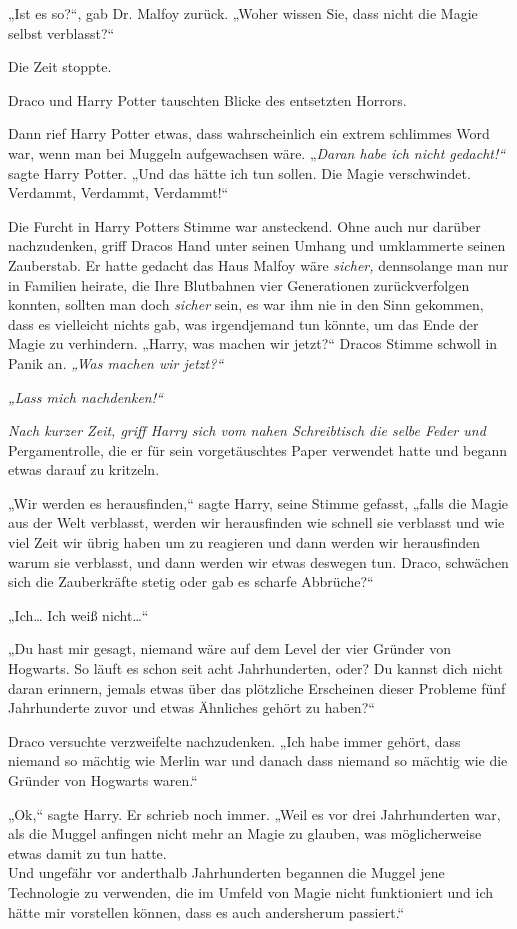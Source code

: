 {„Ist es so?“, gab Dr. Malfoy zurück. „Woher wissen Sie, dass nicht die Magie selbst verblasst?“

Die Zeit stoppte.

Draco und Harry Potter tauschten Blicke des entsetzten Horrors.

Dann rief Harry Potter etwas, dass wahrscheinlich ein extrem schlimmes Word war, wenn man bei Muggeln aufgewachsen wäre. „\emph{Daran habe ich nicht gedacht!“} sagte Harry Potter. „Und das hätte ich tun sollen. Die Magie verschwindet. Verdammt, Verdammt, Verdammt!“

Die Furcht in Harry Potters Stimme war ansteckend. Ohne auch nur darüber nachzudenken, griff Dracos Hand unter seinen Umhang und umklammerte seinen Zauberstab. Er hatte gedacht das Haus Malfoy wäre \emph{sicher,} dennsolange man nur in Familien heirate, die Ihre Blutbahnen vier Generationen zurückverfolgen konnten, sollten man doch \emph{sicher} sein, es war ihm nie in den Sinn gekommen, dass es vielleicht nichts gab, was irgendjemand tun könnte, um das Ende der Magie zu verhindern. „Harry, was machen wir jetzt?“ Dracos Stimme schwoll in Panik an. \emph{„Was machen wir jetzt?“}

\emph{„Lass mich nachdenken!“}

\emph{Nach kurzer Zeit, griff Harry sich vom nahen Schreibtisch die selbe Feder und} Pergamentrolle, die er für sein vorgetäuschtes Paper verwendet hatte und begann etwas darauf zu kritzeln.

„Wir werden es herausfinden,“ sagte Harry, seine Stimme gefasst, „falls die Magie aus der Welt verblasst, werden wir herausfinden wie schnell sie verblasst und wie viel Zeit wir übrig haben um zu reagieren und dann werden wir herausfinden warum sie verblasst, und dann werden wir etwas deswegen tun. Draco, schwächen sich die Zauberkräfte stetig oder gab es scharfe Abbrüche?“

„Ich… Ich weiß nicht…“

„Du hast mir gesagt, niemand wäre auf dem Level der vier Gründer von Hogwarts. So läuft es schon seit acht Jahrhunderten, oder? Du kannst dich nicht daran erinnern, jemals etwas über das plötzliche Erscheinen dieser Probleme fünf Jahrhunderte zuvor und etwas Ähnliches gehört zu haben?“

Draco versuchte verzweifelte nachzudenken. „Ich habe immer gehört, dass niemand so mächtig wie Merlin war und danach dass niemand so mächtig wie die Gründer von Hogwarts waren.“

„Ok,“ sagte Harry. Er schrieb noch immer. „Weil es vor drei Jahrhunderten war, als die Muggel anfingen nicht mehr an Magie zu glauben, was möglicherweise etwas damit zu tun hatte.\\ Und ungefähr vor anderthalb Jahrhunderten begannen die Muggel jene Technologie zu verwenden, die im Umfeld von Magie nicht funktioniert und ich hätte mir vorstellen können, dass es auch andersherum passiert.“

}
